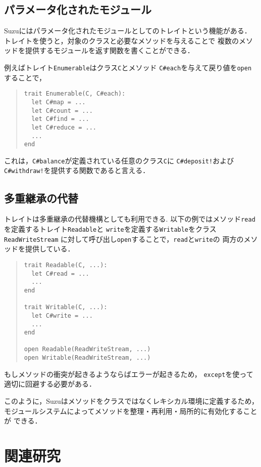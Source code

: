 \documentclass[a4paper,11pt,dvipdfmx]{jreport}
\begin{document}
\section{パラメータ化されたモジュール}

Suzuにはパラメータ化されたモジュールとしてのトレイトという機能がある．
トレイトを使うと，対象のクラスと必要なメソッドを与えることで
複数のメソッドを提供するモジュールを返す関数を書くことができる．

例えばトレイト\verb|Enumerable|はクラス\verb|C|とメソッド
\verb|C#each|を与えて戻り値を\verb|open|することで，
\begin{quote}
\begin{verbatim}
trait Enumerable(C, C#each):
  let C#map = ...
  let C#count = ...
  let C#find = ...
  let C#reduce = ...
  ...
end
\end{verbatim}
\end{quote}
これは，\verb|C#balance|が定義されている任意のクラス\verb|C|に
\verb|C#deposit!|および\verb|C#withdraw!|を提供する関数であると言える．


\section{多重継承の代替}

トレイトは多重継承の代替機構としても利用できる.
以下の例ではメソッド\verb|read|を定義するトレイト\verb|Readable|と
\verb|write|を定義する\verb|Writable|をクラス\verb|ReadWriteStream|
に対して呼び出し\verb|open|することで，\verb|read|と\verb|write|の
両方のメソッドを提供している．
\begin{quote}
\begin{verbatim}
trait Readable(C, ...):
  let C#read = ...
  ...
end

trait Writable(C, ...):
  let C#write = ...
  ...
end

open Readable(ReadWriteStream, ...)
open Writable(ReadWriteStream, ...)
\end{verbatim}
\end{quote}
もしメソッドの衝突が起きるようならばエラーが起きるため，
\verb|except|を使って適切に回避する必要がある．

このように，Suzuはメソッドをクラスではなくレキシカル環境に定義するため，
モジュールシステムによってメソッドを整理・再利用・局所的に有効化することが
できる．


\chapter{関連研究}
\label{chapter:related-work}
\end{document}
